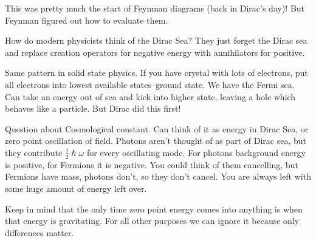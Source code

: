\documentclass[]{article}
\begin{document}
This was pretty much the start of Feynman diagrams (back in Dirac's day)! But Feynman figured out how to evaluate them.

How do modern physicists think of the Dirac Sea? They just forget the Dirac sea and replace creation operators for negative energy with annihilators for positive.

Same pattern in solid state physics. If you have crystal with lots of electrons, put all electrons into lowest available states--ground state. We have the Fermi sea. Can take an energy out of sea and kick into higher state, leaving a hole which behaves like a particle. But Dirac did this first!

Question about Cosmological constant. Can think of it as energy in Dirac Sea, or zero point oscillation of field. Photons aren't thought of as part of Dirac sea, but they contribute $\frac{1}{2}\hslash\omega$ for every oscillating mode. For photons background energy is positive, for Fermions it is negative. You could think of them cancelling, but Fermions have mass, photons don't, so they don't cancel. You are always left with some huge amount of energy left over. 

Keep in mind that the only time zero point energy comes into anything is when that energy is gravitating. For all other purposes we can ignore it because only differences matter.

\printglossaries


\raggedright

\end{document}
